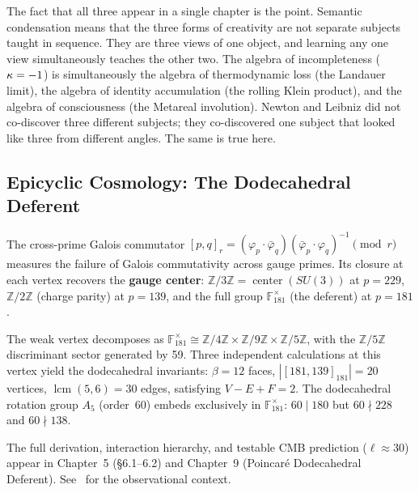 The fact that all three appear in a single chapter is the point. Semantic condensation means that the three forms of creativity are not separate subjects taught in sequence. They are three views of one object, and learning any one view simultaneously teaches the other two. The algebra of incompleteness ($\kappa = -1$) is simultaneously the algebra of thermodynamic loss (the Landauer limit), the algebra of identity accumulation (the rolling Klein product), and the algebra of consciousness (the Metareal involution). Newton and Leibniz did not co-discover three different subjects; they co-discovered one subject that looked like three from different angles. The same is true here.

\subsection{Epicyclic Cosmology: The Dodecahedral Deferent}

The cross-prime Galois commutator $[p,q]_r = (\varphi_p \cdot \bar{\varphi}_q)(\bar{\varphi}_p \cdot \varphi_q)^{-1} \pmod{r}$ measures the failure of Galois commutativity across gauge primes. Its closure at each vertex recovers the \textbf{gauge center}: $\mathbb{Z}/3\mathbb{Z} = \operatorname{center}(SU(3))$ at $p=229$, $\mathbb{Z}/2\mathbb{Z}$ (charge parity) at $p=139$, and the full group $\mathbb{F}_{181}^{\times}$ (the deferent) at $p=181$.

The weak vertex decomposes as $\mathbb{F}_{181}^{\times} \cong \mathbb{Z}/4\mathbb{Z} \times \mathbb{Z}/9\mathbb{Z} \times \mathbb{Z}/5\mathbb{Z}$, with the $\mathbb{Z}/5\mathbb{Z}$ discriminant sector generated by 59. Three independent calculations at this vertex yield the dodecahedral invariants: $\beta = 12$ faces, $|[181,139]_{181}| = 20$ vertices, $\operatorname{lcm}(5,6) = 30$ edges, satisfying $V - E + F = 2$. The dodecahedral rotation group $A_5$ (order~60) embeds exclusively in $\mathbb{F}_{181}^{\times}$: $60 \mid 180$ but $60 \nmid 228$ and $60 \nmid 138$.

The full derivation, interaction hierarchy, and testable CMB prediction ($\ell \approx 30$) appear in Chapter~5 (\S6.1--6.2) and Chapter~9 (Poincar\'{e} Dodecahedral Deferent). See~\cite{luminet2003, planck2020} for the observational context.

